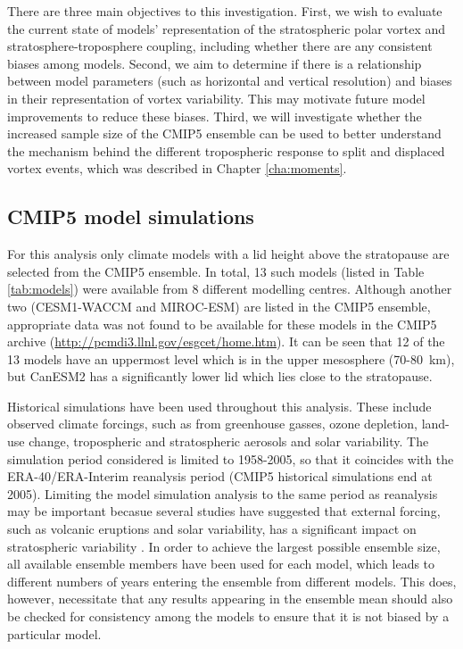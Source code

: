 There are three main objectives to this investigation. First, we wish to
evaluate the current state of models' representation of the stratospheric polar
vortex and stratosphere-troposphere coupling, including whether there are any
consistent biases among models. Second, we aim to determine if there is a
relationship between model parameters (such as horizontal and vertical
resolution) and biases in their representation of vortex variability. This may
motivate future model improvements to reduce these biases. Third, we will
investigate whether the increased sample size of the CMIP5 ensemble can be used
to better understand the mechanism behind the different tropospheric response to
split and displaced vortex events, which was described in Chapter
\ref{cha:moments}.

\subsection{CMIP5 model simulations}

For this analysis only climate models with a lid height above the stratopause
are selected from the CMIP5 ensemble. In total, 13 such models (listed in Table
\ref{tab:models}) were available from 8 different modelling centres. Although
another two (CESM1-WACCM and MIROC-ESM) are listed in the CMIP5 ensemble,
appropriate data was not found to be available for these models in the CMIP5
archive (\url{http://pcmdi3.llnl.gov/esgcet/home.htm}). It can be seen that 12
of the 13 models have an uppermost level which is in the upper mesosphere
(70-80~km), but CanESM2 has a significantly lower lid which lies close to the
stratopause.

Historical simulations have been used throughout this analysis. These include
observed climate forcings, such as from greenhouse gasses, ozone depletion,
land-use change, tropospheric and stratospheric aerosols and solar
variability. The simulation period considered is limited to 1958-2005, so that
it coincides with the ERA-40/ERA-Interim reanalysis period (CMIP5 historical
simulations end at 2005). Limiting the model simulation analysis to the same
period as reanalysis may be important becasue several studies have suggested
that external forcing, such as volcanic eruptions and solar variability, has a
significant impact on stratospheric variability
\citep[e.g.,][]{Robock2000,Gray2010}. In order to achieve the largest possible
ensemble size, all available ensemble members have been used for each model,
which leads to different numbers of years entering the ensemble from different
models. This does, however, necessitate that any results appearing in the
ensemble mean should also be checked for consistency among the models to ensure
that it is not biased by a particular model.

